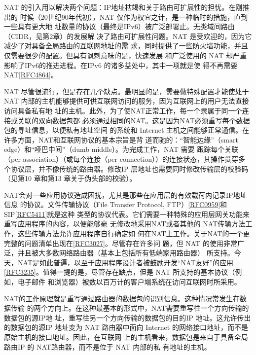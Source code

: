 NAT 的引入用以解决两个问题：IP地址枯竭和关于路由可扩展性的担忧。在刚推出的
时候（20世纪90年代初），NAT 仅作为权宜之计，是一种临时的措施，直到一些具有更大地
址数量的协议（最终是IPv6）被广泛部署止。无类域间路由（CIDR，见第2章）的发展解
决了路由可扩展性问题。NAT 是受欢迎的，因为它减少了对具备全局路由的互联网地址的需
求，同时提供了一些防火墙功能，并且仅需要很少的配置。但具有讽刺意味的是，快速发展
和广泛使用的 NAT 却严重影响了IPv6的推进进程。在IPv6 的诸多益处中，其中一项就是使
得不再需要 NAT\href{https://www.rfc-editor.org/rfc/rfc4864}{[RFC4864]}。

NAT 尽管很流行，但是存在几个缺点。最明显的是，需要做特殊配置才能使处于 NAT
内部的主机能够提供可供互联网访问的服务，因为互联网上的用户无法直接访问具备私有地
址的主机。此外，为了使NAT正常工作，每一个隶属于同一个连接或关联的双向数据包都
必须通过相同的NAT。这是因为NAT必须重写每个数据包的寻址信息，以便私有地址空间
的系统和 Internet 主机之间能够正常通信。在许多方面，NAT和互联网协议的基本宗旨是背
道而驰的：“智能边缘”（smart edge）和“哑巴中间”（dumb middle）。为完成工作，NAT 需要
跟踪每个关联（per-association）（或每个连接（per-connection））的连接状态，其操作贯穿多
个协议层，并不像传统的路由器。修改IP 层地址也需要同时修改传输层的校验码（见第10
章和第13 章关于伪头部的校验）。

NAT会对一些应用协议造成困扰，尤其是那些在应用层的有效载荷内记录IP地址信息
的协议。文件传输协议（File Transfer Protocol, FTP）\href{https://www.rfc-editor.org/rfc/rfc0959}{[RFC0959]}和 SIP\href{https://www.rfc-editor.org/rfc/rfc5411}{[RFC5411]}就是这种
类型的协议代表。它们需要一种特殊的应用层网关功能来重写应用程序的内容，以便能够毫
无修改地采用NAT或者其他的 NAT传输方法工作，这些传输方法允许应用程序自行确定如
何在NAT上工作。关于NAT的一个更完整的问题清单出现在\href{https://www.rfc-editor.org/rfc/rfc3027}{[RFC3027]}。尽管存在许多问
题，但 NAT 的使用非常广泛，并且被大多数网络路由器（基本上包括所有低端家用路由器）
所支持。今天，NAT是如此普遍，以至于应用程序设计者被鼓励开发“NAT友好”的应用
\href{https://www.rfc-editor.org/rfc/rfc3235}{[RFC3235]}。值得一提的是，尽管存在缺点，但是 NAT 所支持的基本协议（例如，电子邮件
和浏览器）被数以百万计的客户端系统在访问互联网时所采用。

NAT的工作原理就是重写通过路由器的数据包的识别信息。这种情况常发生在数据传输
的两个方向上。在这种最基本的形式中，NAT需要重写往一个方向传输的数据包的源IP地
址，重写往另一个方向传输的数据包的目的IP 地址。这允许传出的数据包的源IP 地址变为
NAT 路由器中面向 Internet 的网络接口地址，而不是原始主机的接口地址。因此，在互联网
上的主机看来，数据包是来自于具备全局路由IP 的 NAT路由器，而不是位于 NAT 内部的私
有地址的主机。

